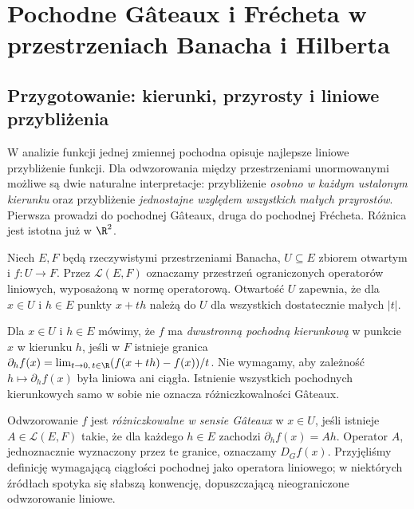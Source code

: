 \setcounter{section}{13}
\section{Pochodne Gâteaux i Frécheta w przestrzeniach Banacha i Hilberta}
\label{sec:gateaux-frechet14}

\subsection{Przygotowanie: kierunki, przyrosty i liniowe przybliżenia}

W analizie funkcji jednej zmiennej pochodna opisuje najlepsze liniowe przybliżenie funkcji. Dla odwzorowania między przestrzeniami unormowanymi możliwe są dwie naturalne interpretacje: przybliżenie \emph{osobno w każdym ustalonym kierunku} oraz przybliżenie \emph{jednostajne względem wszystkich małych przyrostów}. Pierwsza prowadzi do pochodnej Gâteaux, druga do pochodnej Frécheta. Różnica jest istotna już w $\R^2$.

Niech $E,F$ będą rzeczywistymi przestrzeniami Banacha, $U\subseteq E$ zbiorem otwartym i $f:U\to F$. Przez $\mathcal L(E,F)$ oznaczamy przestrzeń ograniczonych operatorów liniowych, wyposażoną w normę operatorową. Otwartość $U$ zapewnia, że dla $x\in U$ i $h\in E$ punkty $x+th$ należą do $U$ dla wszystkich dostatecznie małych $|t|$.

\begin{definicja}
\label{def:directional14}
Dla $x\in U$ i $h\in E$ mówimy, że $f$ ma \emph{dwustronną pochodną kierunkową} w punkcie $x$ w kierunku $h$, jeśli w $F$ istnieje granica
$\partial_h f(x)=\lim_{t\to0,\,t\in\R}(f(x+th)-f(x))/t$.
Nie wymagamy, aby zależność $h\mapsto\partial_h f(x)$ była liniowa ani ciągła. Istnienie wszystkich pochodnych kierunkowych samo w sobie nie oznacza różniczkowalności Gâteaux.
\end{definicja}

\begin{definicja}
\label{def:gateaux14}
Odwzorowanie $f$ jest \emph{różniczkowalne w sensie Gâteaux} w $x\in U$, jeśli istnieje $A\in\mathcal L(E,F)$ takie, że dla każdego $h\in E$ zachodzi $\partial_h f(x)=Ah$. Operator $A$, jednoznacznie wyznaczony przez te granice, oznaczamy $D_Gf(x)$. Przyjęliśmy definicję wymagającą ciągłości pochodnej jako operatora liniowego; w niektórych źródłach spotyka się słabszą konwencję, dopuszczającą nieograniczone odwzorowanie liniowe.
\end{definicja}

